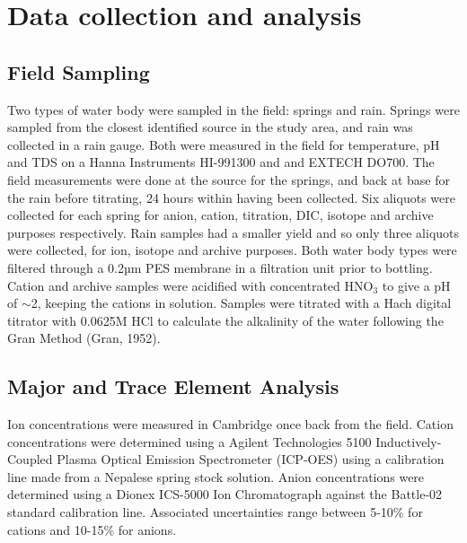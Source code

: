 
\section{Data collection and analysis}



\subsection{Field Sampling}
Two types of water body were sampled in the field: springs and rain. Springs were sampled from the closest identified source in
 the study area, and rain was collected in a rain gauge.
Both were measured in the field for temperature, pH and TDS on a Hanna Instruments HI-991300 and  and EXTECH DO700. The field measurements 
were done at the source for the springs, and back at base for the rain before titrating, 
24 hours within having been collected. 
Six aliquots were collected for each spring for anion, cation, titration, DIC, isotope and archive purposes respectively. 
Rain samples had a smaller yield and so only three aliquots were collected, for ion, isotope and archive purposes. 
Both water body types were filtered through a 0.2µm PES membrane in a filtration unit prior to bottling. 
Cation and archive samples were acidified with concentrated HNO$_3$ to give a pH of $\sim$2, keeping the cations in solution. 
Samples were titrated with a Hach digital titrator with 0.0625M HCl to calculate the alkalinity of the water following the Gran Method (Gran, 1952).






\subsection{Major and Trace Element Analysis}

Ion concentrations were measured in Cambridge once back from the field. Cation concentrations were determined using a Agilent Technologies 
5100 Inductively-Coupled Plasma Optical Emission Spectrometer (ICP-OES) using a calibration line made from a Nepalese spring stock solution.
Anion concentrations were determined using a Dionex ICS-5000 Ion Chromatograph against the Battle-02 standard calibration line. Associated 
uncertainties range between 5-10\% for cations and 10-15\% for anions.

